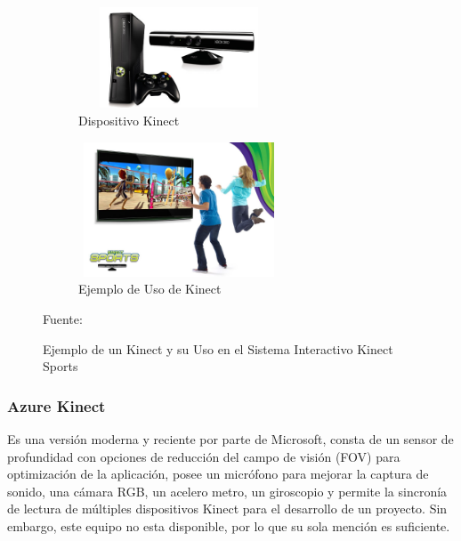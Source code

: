 \begin{figure}
	\centering
	\begin{subfigure}{.5\textwidth}
		\centering
		\includegraphics[width=6cm,height=3cm,]{./Images/kinectex.jpg}
		\caption{Dispositivo Kinect}
		\label{kinectex}
	\end{subfigure}%
	\begin{subfigure}{0.5\textwidth}
		\centering
		\includegraphics[width=6cm,height=4cm,]{./Images/kinectexuse.jpg}
		\caption{Ejemplo de Uso de Kinect}
		\label{kinectexuse}
	\end{subfigure}
	\caption{Ejemplo de un Kinect y su Uso en el Sistema Interactivo Kinect Sports}
	\label{kinectExample}
	\footnotesize Fuente: \cite{kinectex} \cite{kinectexuse}
\end{figure}

\subsubsection{Azure Kinect}

Es una versión moderna y reciente por parte de Microsoft, consta de un sensor de profundidad con opciones de reducción del campo de visión (FOV) para optimización de la aplicación, posee un micrófono para mejorar la captura de sonido, una cámara RGB, un acelero metro, un giroscopio y permite la sincronía de lectura de múltiples dispositivos Kinect para el desarrollo de un proyecto. Sin embargo, este equipo no esta disponible, por lo que su sola mención es suficiente.


